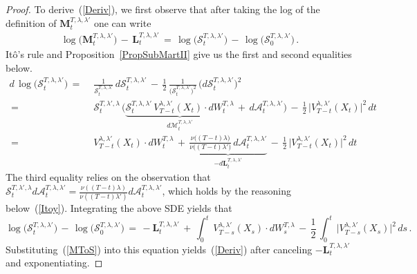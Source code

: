 \documentclass[10pt]{article}
\numberwithin{equation}{section}
\theoremstyle{definition}
\begin{document}
\begin{proof}
To derive~(\ref{Deriv}), we first observe that after taking the log of the definition of $\mathbf{M}_{t}^{T,\lambda,\lambda'}$ one can write
 \begin{align}\label{MToS}
 \log\Big(\mathbf{M}_{t}^{T,\lambda,\lambda'}\Big)\,-\,\mathbf{L}_{t}^{T,\lambda,\lambda'}\,=\, \log\Big(\mathcal{S}_{t}^{T,\lambda,\lambda'}\Big)\,-\,  \log\Big(\mathcal{S}_{0}^{T,\lambda,\lambda'}\Big) \,.  
 \end{align}
 It\^o's rule and Proposition~\ref{PropSubMartII} give us the first and second equalities below.
\begin{align*} 
d\,\log\Big(\mathcal{S}_{t}^{T,\lambda,\lambda'}\Big)\,=\,&\,\frac{1}{\mathcal{S}_{t}^{T,\lambda,\lambda'} }\,d\mathcal{S}_{t}^{T,\lambda,\lambda'}\,-\,\frac{1}{2}\,\frac{1}{\big(\mathcal{S}_{t}^{T,\lambda,\lambda'}\big)^2 }\,\Big(d\mathcal{S}_{t}^{T,\lambda,\lambda'}\Big)^2 \nonumber  \\ \,=\,&\,\mathcal{S}_{t}^{T,\lambda',\lambda} \,\bigg( \underbrace{\mathcal{S}_{t}^{T,\lambda,\lambda'}\,V_{T-t}^{\lambda,\lambda'}(X_t) \cdot dW_{t}^{T,\lambda}}_{ d\mathcal{M}_{t}^{T,\lambda,\lambda'}  }\,+\,d\mathcal{A}_{t}^{T,\lambda,\lambda'}\bigg)\,-\,\frac{1}{2} \, \Big|V^{\lambda,\lambda'}_{T-t}(X_t)\Big|^2 \, dt  \nonumber 
 \\ \,=\,& \, V_{T-t}^{\lambda,\lambda'}(X_t) \cdot dW_{t}^{T,\lambda}\,+\,\underbrace{\frac{\nu\big((T-t) \lambda \big)   }{ \nu\big((T-t) \lambda' \big) }\,d\mathcal{A}_{t}^{T,\lambda,\lambda'}}_{ -d\mathbf{L}_{t}^{T,\lambda,\lambda'}}\,-\,\frac{1}{2}\, \Big|V^{\lambda,\lambda'}_{T-t}(X_t)\Big|^2\, dt 
\end{align*}
The third equality relies on the observation that  $\mathcal{S}_{t}^{T,\lambda',\lambda} d\mathcal{A}_{t}^{T,\lambda,\lambda'} =  \frac{\nu((T-t)\lambda )  }{\nu((T-t)\lambda' )  } d\mathcal{A}_{t}^{T,\lambda,\lambda'} $,  which holds by the reasoning below~(\ref{Itoy}).  Integrating the above SDE yields that
$$ \log\Big(\mathcal{S}_{t}^{T,\lambda,\lambda'}\Big)\,-\,\log\Big(\mathcal{S}_{0}^{T,\lambda,\lambda'}\Big)\,=\,-\mathbf{L}_{t}^{T,\lambda,\lambda'}\,+\, \int_0^t\, V_{T-s}^{\lambda,\lambda'}(X_s)\cdot dW_{s}^{T,\lambda}  \,-\,\frac{1}{2}\,\int_0^t  \,\Big|V^{\lambda,\lambda'}_{T-s}(X_s)\Big|^2\, ds\,.    $$
Substituting~(\ref{MToS}) into this equation yields~(\ref{Deriv}) after canceling $-\mathbf{L}_{t}^{T,\lambda,\lambda'}$ and exponentiating.


\end{proof}
\end{document}
